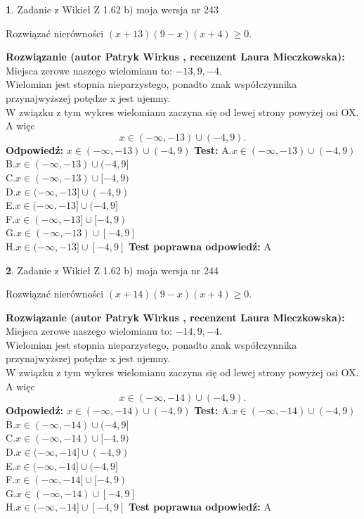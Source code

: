 \documentclass[12pt, a4paper]{article}
\theoremstyle{definition} %
\newtheorem{zad}{}
\newcommand{\zadStart}[1]{\begin{zad}#1\newline}
\newcommand{\zadStop}{\end{zad}}
\newcommand{\rozwStart}[2]{\noindent \textbf{Rozwiązanie (autor #1 , recenzent #2): }\newline}
\newcommand{\rozwStop}{\newline}
\newcommand{\odpStart}{\noindent \textbf{Odpowiedź:}\newline}
\newcommand{\odpStop}{\newline}
\newcommand{\testStart}{\noindent \textbf{Test:}\newline}
\newcommand{\testStop}{\newline}
\newcommand{\kluczStart}{\noindent \textbf{Test poprawna odpowiedź:}\newline}
\newcommand{\kluczStop}{\newline}
\begin{document}
\zadStart{Zadanie z Wikieł Z 1.62 b) moja wersja nr 243}

Rozwiązać nierówności $(x+13)(9-x)(x+4)\ge0$.
\zadStop
\rozwStart{Patryk Wirkus}{Laura Mieczkowska}
Miejsca zerowe naszego wielomianu to: $-13, 9, -4$.\\
Wielomian jest stopnia nieparzystego, ponadto znak współczynnika przy\linebreak najwyższej potędze x jest ujemny.\\ W związku z tym wykres wielomianu zaczyna się od lewej strony powyżej osi OX. A więc $$x \in (-\infty,-13) \cup (-4,9).$$
\rozwStop
\odpStart
$x \in (-\infty,-13) \cup (-4,9)$
\odpStop
\testStart
A.$x \in (-\infty,-13) \cup (-4,9)$\\
B.$x \in (-\infty,-13) \cup (-4,9]$\\
C.$x \in (-\infty,-13) \cup [-4,9)$\\
D.$x \in (-\infty,-13] \cup (-4,9)$\\
E.$x \in (-\infty,-13] \cup (-4,9]$\\
F.$x \in (-\infty,-13] \cup [-4,9)$\\
G.$x \in (-\infty,-13) \cup [-4,9]$\\
H.$x \in (-\infty,-13] \cup [-4,9]$
\testStop
\kluczStart
A
\kluczStop



\zadStart{Zadanie z Wikieł Z 1.62 b) moja wersja nr 244}

Rozwiązać nierówności $(x+14)(9-x)(x+4)\ge0$.
\zadStop
\rozwStart{Patryk Wirkus}{Laura Mieczkowska}
Miejsca zerowe naszego wielomianu to: $-14, 9, -4$.\\
Wielomian jest stopnia nieparzystego, ponadto znak współczynnika przy\linebreak najwyższej potędze x jest ujemny.\\ W związku z tym wykres wielomianu zaczyna się od lewej strony powyżej osi OX. A więc $$x \in (-\infty,-14) \cup (-4,9).$$
\rozwStop
\odpStart
$x \in (-\infty,-14) \cup (-4,9)$
\odpStop
\testStart
A.$x \in (-\infty,-14) \cup (-4,9)$\\
B.$x \in (-\infty,-14) \cup (-4,9]$\\
C.$x \in (-\infty,-14) \cup [-4,9)$\\
D.$x \in (-\infty,-14] \cup (-4,9)$\\
E.$x \in (-\infty,-14] \cup (-4,9]$\\
F.$x \in (-\infty,-14] \cup [-4,9)$\\
G.$x \in (-\infty,-14) \cup [-4,9]$\\
H.$x \in (-\infty,-14] \cup [-4,9]$
\testStop
\kluczStart
A
\kluczStop
\end{document}
